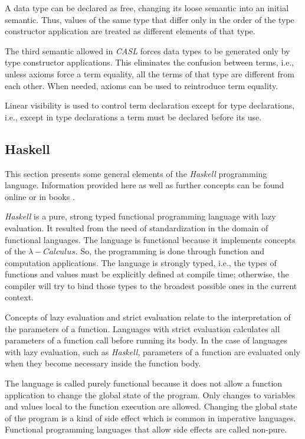 \documentclass[12pt,twoside]{article}
\numberwithin{spec}{subsection}
\numberwithin{proof}{subsection}
\numberwithin{figure}{subsection}
\numberwithin{code}{subsection}
\begin{document}
A data type can be declared as free, changing its loose semantic into an initial semantic. Thus, values of the same type that differ only in the order of the type constructor application are treated as different elements of that type.

The third semantic allowed in \textit{CASL} forces data types to be generated only by type constructor applications. This eliminates the confusion between terms, i.e., unless axioms force a term equality, all the terms of that type are different from each other. When needed, axioms can be used to reintroduce term equality.

Linear visibility is used to control term declaration except for type declarations, i.e., except in type declarations a term must be declared before its use.

\subsection{Haskell}
This section presents some general elements of the \textit{Haskell} programming language. Information provided here as well as further concepts can be found online \citep{learnHaskell} or in books \citep{Thompson1999}.

\textit{Haskell} is a pure, strong typed functional programming language with lazy evaluation. It resulted from the need of standardization in the domain of functional languages. The language is functional because it implements concepts of the $\lambda-Calculus$. So, the programming is done through function and computation applications. The language is strongly typed, i.e., the types of functions and values must be explicitly defined at compile time; otherwise, the compiler will try to bind those types to the broadest possible ones in the current context.

Concepts of lazy evaluation and strict evaluation relate to the interpretation of the parameters of a function. Languages with strict evaluation calculates all parameters of a function call before running its body. In the case of languages with lazy evaluation, such as \textit{Haskell}, parameters of a function are evaluated only when they become necessary inside the function body.

The language is called purely functional because it does not allow a function application to change the global state of the program. Only changes to variables and values local to the function execution are allowed. Changing the global state of the program is a kind of side effect which is common in imperative languages. Functional programming languages that allow side effects are called non-pure.
\end{document}
